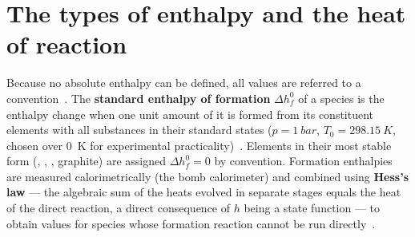 \section{The types of enthalpy and the heat of reaction}

Because no absolute enthalpy can be defined, all values are referred to a convention~\cite{lecture1,Langella_LectureNotes}. The \textbf{standard enthalpy of formation} $\Delta h_f^0$ of a species is the enthalpy change when one unit amount of it is formed from its constituent elements with all substances in their standard states ($p=\SI{1}{bar}$, $T_0=\SI{298.15}{K}$, chosen over \SI{0}{K} for experimental practicality)~\cite{lecture1}. Elements in their most stable form (, , , graphite) are assigned $\Delta h_f^0=0$ by convention. Formation enthalpies are measured calorimetrically (the bomb calorimeter) and combined using \textbf{Hess's law} --- the algebraic sum of the heats evolved in separate stages equals the heat of the direct reaction, a direct consequence of $h$ being a state function --- to obtain values for species whose formation reaction cannot be run directly~\cite{lecture1,warnatz2006combustion,maas_combustion_lecture}.

